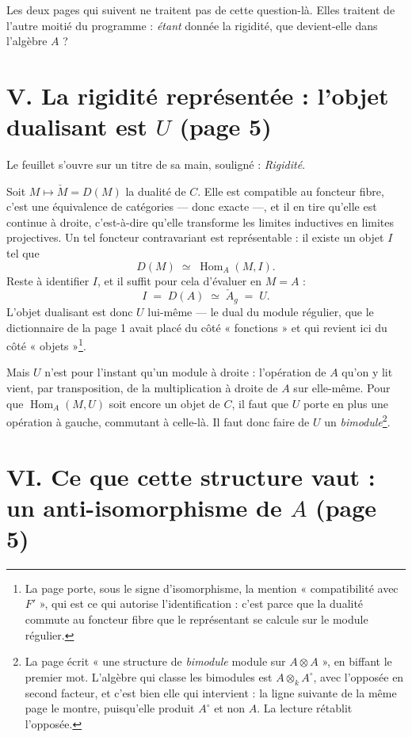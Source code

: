 \documentclass[11pt,a4paper]{article}
\begin{document}
Les deux pages qui suivent ne traitent pas de cette question-là. Elles
traitent de l'autre moitié du programme : \emph{étant} donnée la rigidité, que
devient-elle dans l'algèbre $A$ ?

\section*{V. La rigidité représentée : l'objet dualisant est $U$ (page 5)}

Le feuillet s'ouvre sur un titre de sa main, souligné : \emph{Rigidité}.

Soit $M \mapsto \check{M} = D(M)$ la dualité de $C$. Elle est compatible au
foncteur fibre, c'est une équivalence de catégories — donc exacte —, et il en
tire qu'elle est continue à droite, c'est-à-dire qu'elle transforme les limites
inductives en limites projectives. Un tel foncteur contravariant est
représentable : il existe un objet $I$ tel que
\[
D(M) \;\simeq\; \operatorname{Hom}_{A}(M, I).
\]
Reste à identifier $I$, et il suffit pour cela d'évaluer en $M = A$ :
\[
I \;=\; D(A) \;\simeq\; \check{A}_{g} \;=\; U.
\]
L'objet dualisant est donc $U$ lui-même — le dual du module régulier, que le
dictionnaire de la page 1 avait placé du côté « fonctions » et qui revient ici
du côté « objets »\footnote{La page porte, sous le signe d'isomorphisme, la
mention « compatibilité avec $F'$ », qui est ce qui autorise l'identification :
c'est parce que la dualité commute au foncteur fibre que le représentant se
calcule sur le module régulier.}.

Mais $U$ n'est pour l'instant qu'un module à droite : l'opération de $A$ qu'on
y lit vient, par transposition, de la multiplication à droite de $A$ sur
elle-même. Pour que $\operatorname{Hom}_{A}(M, U)$ soit encore un objet de $C$,
il faut que $U$ porte en plus une opération à gauche, commutant à celle-là. Il
faut donc faire de $U$ un \emph{bimodule}\footnote{La page écrit « une
structure de \emph{bimodule} module sur $A \otimes A$ », en biffant le premier
mot. L'algèbre qui classe les bimodules est $A \otimes_{k} A^{\circ}$, avec
l'opposée en second facteur, et c'est bien elle qui intervient : la ligne
suivante de la même page le montre, puisqu'elle produit $A^{\circ}$ et non $A$.
La lecture rétablit l'opposée.}.

\section*{VI. Ce que cette structure vaut : un anti-isomorphisme de $A$ (page 5)}
\end{document}
